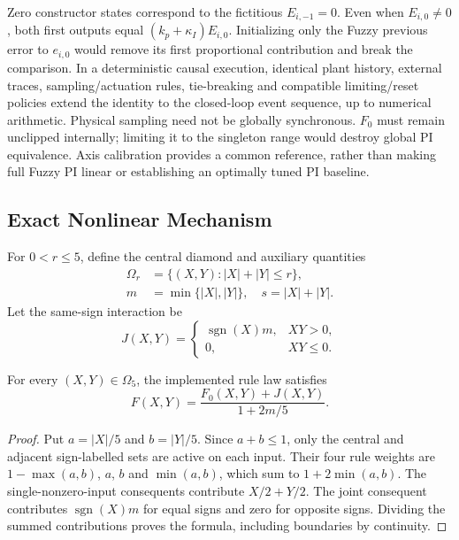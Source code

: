 Zero constructor states correspond to the fictitious $E_{i,-1}=0$.
Even when $E_{i,0}\ne0$, both first outputs equal
$(k_p+\kappa_I)E_{i,0}$. Initializing only the Fuzzy previous error to
$e_{i,0}$ would remove its first proportional contribution and break the
comparison. In a deterministic causal execution, identical plant history,
external traces, sampling/actuation rules, tie-breaking and compatible
limiting/reset policies extend the identity to the closed-loop event
sequence, up to numerical arithmetic. Physical sampling need not be globally
synchronous. $F_0$ must remain unclipped internally; limiting it to the
singleton range would destroy global PI equivalence. Axis calibration
provides a common reference, rather than making full Fuzzy PI linear or
establishing an optimally tuned PI baseline.

\subsection{Exact Nonlinear Mechanism}
\label{subsec:fpi_mechanism}

For $0<r\le5$, define the central diamond and auxiliary quantities
\begin{align}
 \Omega_r&=\{(X,Y):|X|+|Y|\le r\},\nonumber\\
 m&=\min\{|X|,|Y|\},\quad s=|X|+|Y|.
 \label{eq:fpi_domain}
\end{align}
Let the same-sign interaction be
\begin{equation}
 J(X,Y)=\begin{cases}
 \operatorname{sgn}(X)m,&XY>0,\\
 0,&XY\le0.
 \end{cases}
 \label{eq:fpi_interaction}
\end{equation}

\begin{btdproposition}
\label{prop:fpi_central}
For every $(X,Y)\in\Omega_5$, the implemented rule law satisfies
\begin{equation}
 \boxed{F(X,Y)=\frac{F_0(X,Y)+J(X,Y)}{1+2m/5}.}
 \label{eq:fpi_central}
\end{equation}
\end{btdproposition}
\begin{proof}
Put $a=|X|/5$ and $b=|Y|/5$. Since $a+b\le1$, only the central and
adjacent sign-labelled sets are active on each input. Their four rule
weights are $1-\max(a,b)$, $a$, $b$ and $\min(a,b)$, which sum to
$1+2\min(a,b)$. The single-nonzero-input consequents contribute
$X/2+Y/2$. The joint consequent contributes
$\operatorname{sgn}(X)m$ for equal signs and zero for opposite signs.
Dividing the summed contributions proves the formula, including boundaries
by continuity.
\end{proof}

